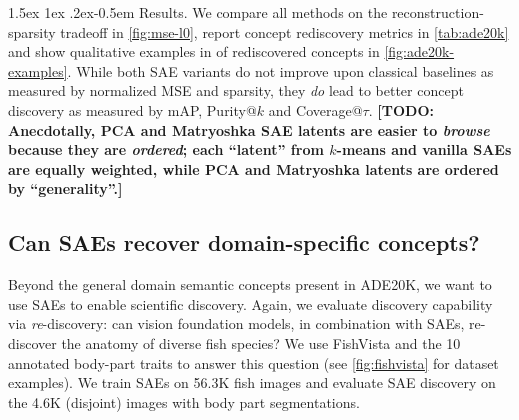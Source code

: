 \documentclass[10pt,twocolumn,letterpaper]{article}
\makeatletter
\newcommand{\todo}[1]{\textbf{\color{red}[TODO: #1]}}
\renewcommand{\paragraph}{%
  \@startsection{paragraph}{4}%
  {\z@}{1.5ex \@plus 1ex \@minus .2ex}{-0.5em}%
  {\normalfont\normalsize\bfseries}%
}
\makeatother
\begin{document}
\paragraph{Results.}
We compare all methods on the reconstruction-sparsity tradeoff in \cref{fig:mse-l0}, report concept rediscovery metrics in \cref{tab:ade20k} and show qualitative examples in of rediscovered concepts in \cref{fig:ade20k-examples}.
While both SAE variants do not improve upon classical baselines as measured by normalized MSE and sparsity, they \textit{do} lead to better concept discovery as measured by mAP, Purity@$k$ and Coverage@$\tau$.
\todo{Anecdotally, PCA and Matryoshka SAE latents are easier to \textit{browse} because they are \textit{ordered}; each ``latent'' from $k$-means and vanilla SAEs are equally weighted, while PCA and Matryoshka latents are ordered by ``generality''.}




\subsection{Can SAEs recover domain-specific concepts?}
\label{sec:fishvista}

Beyond the general domain semantic concepts present in ADE20K, we want to use SAEs to enable scientific discovery.
Again, we evaluate discovery capability via \textit{re}-discovery: can vision foundation models, in combination with SAEs, re-discover the anatomy of diverse fish species? 
We use FishVista \citep{mehrab2024fishvista,fishvistadataset} and the 10 annotated body-part traits to answer this question (see \cref{fig:fishvista} for dataset examples).
We train SAEs on \num{56.3}K fish images and evaluate SAE discovery on the 4.6K (disjoint) images with body part segmentations.
\end{document}
